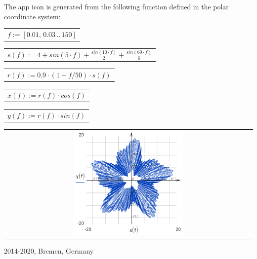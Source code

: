\documentclass[DIV=calc, paper=a4, fontsize=11pt, twocolumn]{scrartcl}
\begin{document}
The app icon is generated from the
following function defined in the
polar coordinate system:
\begin{center}\begin{tabular}{c}
  $f := \left[ 0.01,\, 0.03 \,..\, 150 \right]$
\end{tabular}\end{center}
\begin{center}\begin{tabular}{c}
  $s(f) := 4 + sin \left( 5 \cdot f\right)  + \frac{sin \left( 10 \cdot f\right) }{2} + \frac{sin \left( 60 \cdot f\right) }{6}$
\end{tabular}\end{center}
\begin{center}\begin{tabular}{c}
  $r(f) := 0.9 \cdot \left( 1 + f / 50 \right) \cdot s \left( f\right) $
\end{tabular}\end{center}
\begin{center}\begin{tabular}{c}
  $x(f) := r \left( f\right)  \cdot cos \left( f\right) $
\end{tabular}\end{center}
\begin{center}\begin{tabular}{c}
  $y(f) := r \left( f\right)  \cdot sin \left( f\right) $
\end{tabular}\end{center}
\begin{center}\begin{tabular}{c} \includegraphics[width=0.45\textwidth]{graphics/about_micromath_fig1.png} \end{tabular}\end{center}

2014-2020, Bremen, Germany
\end{document}
